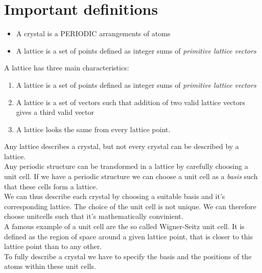 \documentclass{report}
\begin{document}
\section{Important definitions}
\begin{itemize}
	\item A crystal is a PERIODIC arrangements of atoms
	\item A lattice is a set of points defined as integer sums of \emph{primitive lattice vectors}
\end{itemize}
A lattice has three main characteristics:
\begin{enumerate}
	\item A lattice is a set of points defined as integer sums of \emph{primitive lattice vectors}
	\item A lattice is a set of vectors such that addition of two valid lattice vectors gives a third valid vector
	\item A lattice looks the same from every lattice point.
\end{enumerate}
Any lattice describes a crystal, but not every crystal can be described by a lattice.\\
Any periodic structure can be transformed in a lattice by carefully choosing a unit cell. If we have a periodic structure we can choose a unit cell as a \emph{basis} such that these cells form a lattice.\\
We can thus describe each crystal by choosing a suitable basis and it's corresponding lattice. The choice of the unit cell is not unique. We can therefore choose unitcells such that it's mathematically convinient.\\
A famous example of a unit cell are the so called Wigner-Seitz unit cell. It is defined as the region of space around a given lattice point, that is closer to this lattice point than to any other.\\
To fully describe a crystal we have to specify the basis and the positions of the atoms within these unit cells.
\end{document}
